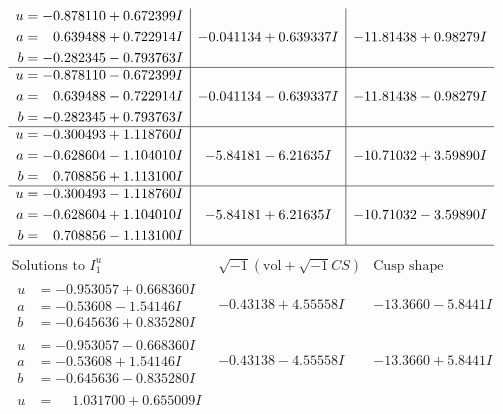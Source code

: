 \documentclass[1p]{elsarticle_modified}
\theoremstyle{definition}
\newcommand{\I}{\sqrt{-1}}
\begin{document}
$$\begin{array}{c|c|c}
\begin{aligned}
u &= -0.878110 + 0.672399 I \\
a &= \phantom{-}0.639488 + 0.722914 I \\
b &= -0.282345 - 0.793763 I\end{aligned}
 & -0.041134 + 0.639337 I & -11.81438 + 0.98279 I \\ \hline\begin{aligned}
u &= -0.878110 - 0.672399 I \\
a &= \phantom{-}0.639488 - 0.722914 I \\
b &= -0.282345 + 0.793763 I\end{aligned}
 & -0.041134 - 0.639337 I & -11.81438 - 0.98279 I \\ \hline\begin{aligned}
u &= -0.300493 + 1.118760 I \\
a &= -0.628604 - 1.104010 I \\
b &= \phantom{-}0.708856 + 1.113100 I\end{aligned}
 & -5.84181 - 6.21635 I & -10.71032 + 3.59890 I \\ \hline\begin{aligned}
u &= -0.300493 - 1.118760 I \\
a &= -0.628604 + 1.104010 I \\
b &= \phantom{-}0.708856 - 1.113100 I\end{aligned}
 & -5.84181 + 6.21635 I & -10.71032 - 3.59890 I\\
 \hline 
 \end{array}$$\newpage$$\begin{array}{c|c|c}  
\text{Solutions to }I^u_{1}& \I (\text{vol} + \sqrt{-1}CS) & \text{Cusp shape}\\
 \hline 
\begin{aligned}
u &= -0.953057 + 0.668360 I \\
a &= -0.53608 - 1.54146 I \\
b &= -0.645636 + 0.835280 I\end{aligned}
 & -0.43138 + 4.55558 I & -13.3660 - 5.8441 I \\ \hline\begin{aligned}
u &= -0.953057 - 0.668360 I \\
a &= -0.53608 + 1.54146 I \\
b &= -0.645636 - 0.835280 I\end{aligned}
 & -0.43138 - 4.55558 I & -13.3660 + 5.8441 I \\ \hline\begin{aligned}
u &= \phantom{-}1.031700 + 0.655009 I \\

\end{aligned}
\end{array}$$
\end{document}
